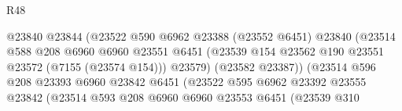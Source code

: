 \begin{lexlean}{R48}
\begin{coremodule}
                                              @23840
                                              @23844
                                              (@23522
                                                @590
                                                @6962
                                                @23388
                                                (@23552 @6451)
                                                @23840
                                                (@23514
                                                  @588
                                                  @208
                                                  @6960
                                                  @6960
                                                  @23551
                                                  @6451
                                                  (@23539
                                                    @154
                                                    @23562
                                                    @190
                                                    @23551
                                                    @23572
                                                    (@7155 (@23574 @154)))
                                                  @23579)
                                                (@23582 @23387))
                                              (@23514
                                                @596
                                                @208
                                                @23393
                                                @6960
                                                @23842
                                                @6451
                                                (@23522
                                                  @595
                                                  @6962
                                                  @23392
                                                  @23555
                                                  @23842
                                                  (@23514
                                                    @593
                                                    @208
                                                    @6960
                                                    @6960
                                                    @23553
                                                    @6451
                                                    (@23539
                                                      @310

\end{coremodule}
\end{lexlean}
